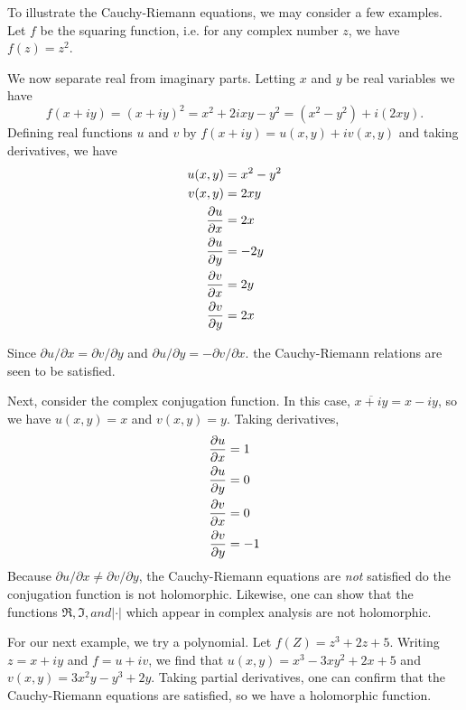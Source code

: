 \documentclass[12pt]{article}
\begin{document}
To illustrate the Cauchy-Riemann equations, we may consider a few
examples.  Let $f$ be the squaring function, i.e. for any complex
number $z$, we have $f(z) = z^2$.

We now separate real from imaginary parts.  Letting $x$ and $y$ be
real variables we have
\[
 f(x + iy) = (x + iy)^2 
           = x^2 + 2ixy - y^2
           = (x^2 - y^2) + i (2xy) .
\]
Defining real functions $u$ and $v$ by $f(x+iy) = u(x,y) + i v (x,y)$ 
and taking derivatives, we have
\begin{align*}
u(x,y) & = x^2 - y^2  \\
v(x,y) &= 2xy \\
{\partial u \over \partial x} &= 2x \\
{\partial u \over \partial y} &= -2y \\
{\partial v \over \partial x} &= 2y \\
{\partial v \over \partial y} &= 2x
\end{align*}

Since $\partial u / \partial x = \partial v / \partial y$ and
$\partial u / \partial y = - \partial v / \partial x$. the
Cauchy-Riemann relations are seen to be satisfied.

Next, consider the complex conjugation function.  In this
case, $\overline{x + i y} = x - iy$, so we have $u(x,y) = x$ 
and $v(x,y) = y$.  Taking derivatives,
\begin{align*}
{\partial u \over \partial x} &= 1 \\
{\partial u \over \partial y} &= 0 \\
{\partial v \over \partial x} &= 0 \\
{\partial v \over \partial y} &= -1
\end{align*}
Because $\partial u / \partial x \neq \partial v / \partial y$,
the Cauchy-Riemann equations are \emph{not} satisfied do the
conjugation function is not holomorphic.  Likewise, one can show
that the functions $\Re, \Im, and | \cdot |$ which appear in
complex analysis are not holomorphic.

For our next example, we try a polynomial.  Let $f(Z) =
z^3 + 2 z + 5$.  Writing $z = x+iy$ and $f = u + iv$, 
we find that $u(x,y) = x^3 - 3 x y^2 + 2x + 5$ and
$v(x,y) = 3 x^2 y - y^3 + 2y$.  Taking partial derivatives,
one can confirm that the Cauchy-Riemann equations
are satisfied, so we have a holomorphic function.
\end{document}
